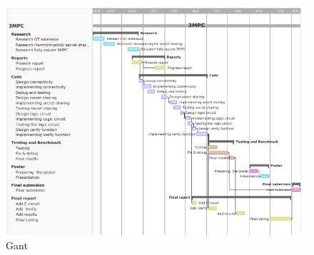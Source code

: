 \documentclass[12pt]{article}
\begin{document}
\begin{figure}[h!]
	\centering
	\includegraphics[scale=0.8]{"../Figures/gant_new"}
	\caption{Gant}
	\label{fig:gantfig1}
\end{figure}


\pagebreak
\end{document}
